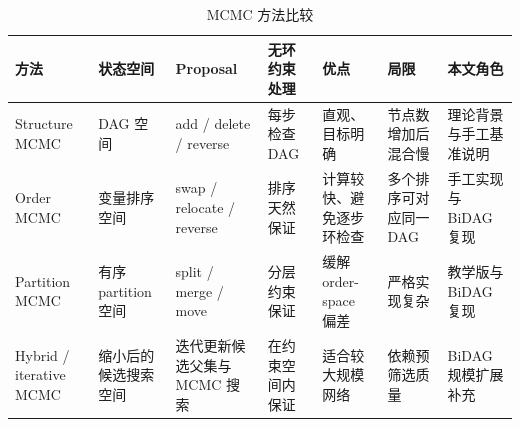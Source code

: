 \begin{table}[H]
\centering
\small
\setlength{\tabcolsep}{2pt}
\caption{MCMC 方法比较}
\label{tab:method_compare}
\begin{tabular}{p{1.9cm}p{2.0cm}p{2.5cm}p{2.1cm}p{2.2cm}p{2.0cm}p{2.3cm}}
\toprule
方法 & 状态空间 & Proposal & 无环约束处理 & 优点 & 局限 & 本文角色
\\
\midrule
Structure MCMC & DAG 空间 & add / delete / reverse & 每步检查 DAG & 直观、目标明确 & 节点数增加后混合慢 & 理论背景与手工基准说明 \\
Order MCMC & 变量排序空间 & swap / relocate / reverse & 排序天然保证 & 计算较快、避免逐步环检查 & 多个排序可对应同一 DAG & 手工实现与 BiDAG 复现 \\
Partition MCMC & 有序 partition 空间 & split / merge / move & 分层约束保证 & 缓解 order-space 偏差 & 严格实现复杂 & 教学版与 BiDAG 复现 \\
Hybrid / iterative MCMC & 缩小后的候选搜索空间 & 迭代更新候选父集与 MCMC 搜索 & 在约束空间内保证 & 适合较大规模网络 & 依赖预筛选质量 & BiDAG 规模扩展补充 \\
\bottomrule
\end{tabular}
\end{table}
